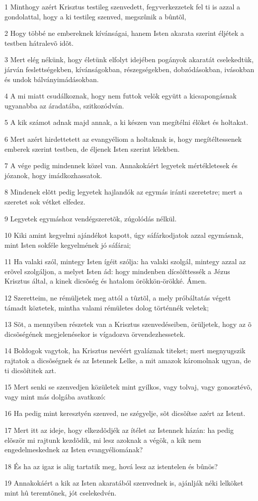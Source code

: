 \par 1 Minthogy azért Krisztus testileg szenvedett, fegyverkezzetek fel ti is azzal a gondolattal, hogy a ki testileg szenved, megszûnik a bûntõl,
\par 2 Hogy többé ne embereknek kívánságai, hanem Isten akarata szerint éljétek a testben hátralevõ idõt.
\par 3 Mert elég nékünk, hogy életünk elfolyt idejében pogányok akaratát cselekedtük, járván feslettségekben, kívánságokban, részegségekben, dobzódásokban, ivásokban és undok bálványimádásokban.
\par 4 A mi miatt csudálkoznak, hogy nem futtok velök együtt a kicsapongásnak ugyanabba az áradatába, szitkozódván.
\par 5 A kik számot adnak majd annak, a ki készen van megítélni élõket és holtakat.
\par 6 Mert azért hirdettetett az evangyéliom a holtaknak is, hogy megítéltessenek emberek szerint testben, de éljenek Isten szerint lélekben.
\par 7 A vége pedig mindennek közel van. Annakokáért legyetek mértékletesek és józanok, hogy imádkozhassatok.
\par 8 Mindenek elõtt pedig legyetek hajlandók az egymás iránti szeretetre; mert a szeretet sok vétket elfedez.
\par 9 Legyetek egymáshoz vendégszeretõk, zúgolódás nélkül.
\par 10 Kiki amint kegyelmi ajándékot kapott, úgy sáfárkodjatok azzal egymásnak, mint Isten sokféle kegyelmének jó sáfárai;
\par 11 Ha valaki szól, mintegy Isten ígéit szólja: ha valaki szolgál, mintegy azzal az erõvel szolgáljon, a melyet Isten ád: hogy mindenben dícsõíttessék a Jézus Krisztus által, a kinek dicsõség és hatalom örökkön-örökké. Ámen.
\par 12 Szeretteim, ne rémüljetek meg attól a tûztõl, a mely próbáltatás végett támadt köztetek, mintha valami rémületes dolog történnék veletek;
\par 13 Sõt, a mennyiben részetek van a Krisztus szenvedéseiben, örüljetek, hogy az õ dicsõségének megjelenésekor is vígadozva örvendezhessetek.
\par 14 Boldogok vagytok, ha Krisztus nevéért gyaláznak titeket; mert megnyugszik rajtatok a dicsõségnek és az Istennek Lelke, a mit amazok káromolnak ugyan, de ti dicsõítitek azt.
\par 15 Mert senki se szenvedjen közületek mint gyilkos, vagy tolvaj, vagy gonosztévõ, vagy mint más dolgába avatkozó:
\par 16 Ha pedig mint keresztyén szenved, ne szégyelje, sõt dicsõítse azért az Istent.
\par 17 Mert itt az ideje, hogy elkezdõdjék az ítélet az Istennek házán: ha pedig elõször mi rajtunk kezdõdik, mi lesz azoknak a végök, a kik nem engedelmeskednek az Isten evangyéliomának?
\par 18 És ha az igaz is alig tartatik meg, hová lesz az istentelen és bûnös?
\par 19 Annakokáért a kik az Isten akaratából szenvednek is, ajánlják néki lelköket mint hû teremtõnek, jót cselekedvén.

